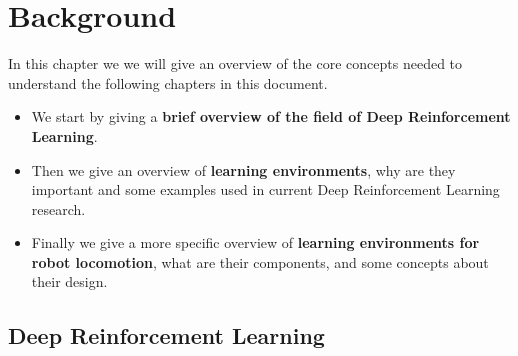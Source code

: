 \chapter{Background}
\label{ch:background}



In this chapter we we will give an overview of the core concepts needed to
understand the following chapters in this document. 


\begin{itemize}
    \item We start by giving a \textbf{brief overview of the field of Deep Reinforcement Learning}.
    \item Then we give an overview of \textbf{learning environments}, why are they 
          important and some examples used in current Deep Reinforcement Learning research.
    \item Finally we give a more specific overview of \textbf{learning environments 
          for robot locomotion}, what are their components, and some concepts about their design.
\end{itemize}


\section{Deep Reinforcement Learning}

